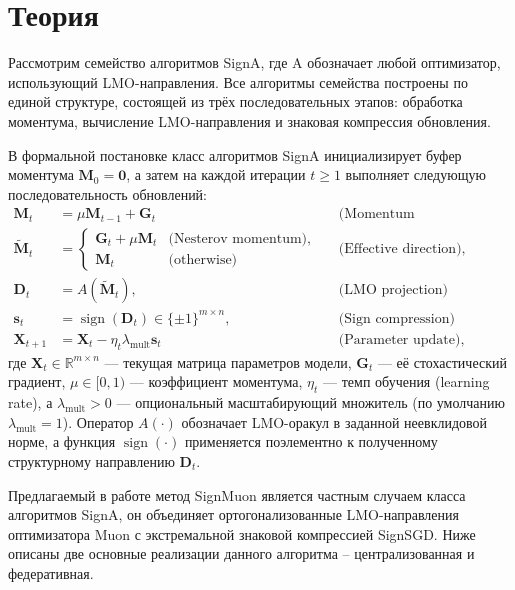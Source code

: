 \documentclass{article}
\begin{document}
\section{Теория}\label{sec:theory}
Рассмотрим семейство алгоритмов SignA, где A обозначает любой оптимизатор, использующий LMO-направления. Все алгоритмы семейства построены по единой структуре, состоящей из трёх последовательных этапов: обработка моментума, вычисление LMO-направления и знаковая компрессия обновления. 

В формальной постановке класс алгоритмов SignA инициализирует буфер моментума $\mathbf{M}_0 = \mathbf{0}$, а затем на каждой итерации $t \ge 1$ выполняет следующую последовательность обновлений:
\begin{equation}
\begin{aligned}
\mathbf{M}_t &= \mu \mathbf{M}_{t-1} + \mathbf{G}_t && \text{(Momentum accumulation)}\\
\tilde{\mathbf{M}}_t &= 
\begin{cases} 
    \mathbf{G}_t + \mu \mathbf{M}_t & \text{(Nesterov momentum)}, \\
    \mathbf{M}_t & \text{(otherwise)}
\end{cases} && \text{(Effective direction)}, \\
\mathbf{D}_t &= A(\tilde{\mathbf{M}}_t), && \text{(LMO projection)} \\
\mathbf{s}_t &= \operatorname{sign}(\mathbf{D}_t) \in \{\pm 1\}^{m \times n},  && \text{(Sign compression)}\\
\mathbf{X}_{t+1} &= \mathbf{X}_t - \eta_t \lambda_{\mathrm{mult}} \mathbf{s}_t && \text{(Parameter update)},
\end{aligned}
\label{eq:signa_general}
\end{equation}
 где $\mathbf{X}_t \in \mathbb{R}^{m \times n}$ — текущая матрица параметров модели, $\mathbf{G}_t$ — её стохастический градиент, $\mu \in [0, 1)$ — коэффициент моментума, $\eta_t$ — темп обучения (learning rate), а $\lambda_{\mathrm{mult}} > 0$ — опциональный масштабирующий множитель (по умолчанию $\lambda_{\mathrm{mult}}=1$). Оператор $A(\cdot)$ обозначает LMO-оракул в заданной неевклидовой норме, а функция $\operatorname{sign}(\cdot)$ применяется поэлементно к полученному структурному направлению $\mathbf{D}_t$.

Предлагаемый в работе метод SignMuon является частным случаем класса алгоритмов SignA, он объединяет ортогонализованные LMO-направления оптимизатора Muon с экстремальной знаковой компрессией SignSGD. Ниже описаны две основные реализации данного алгоритма -- централизованная и федеративная.
\end{document}
